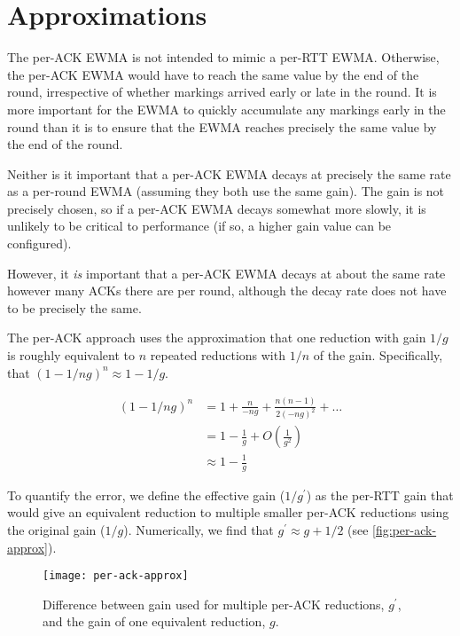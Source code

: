 \section{Approximations}\label{prresp_approx}

The per-ACK EWMA is not intended to mimic a per-RTT EWMA. Otherwise, the per-ACK
EWMA would have to reach the same value by the end of the round, irrespective of
whether markings arrived early or late in the round.
It is more important for the EWMA to quickly accumulate any markings early in
the round than it is to ensure that the EWMA reaches precisely the same value by
the end of the round. 

Neither is it important that a per-ACK EWMA decays at precisely the same rate as
a per-round EWMA (assuming they both use the same gain). The gain is not
precisely chosen, so if a per-ACK EWMA decays somewhat more slowly, it is
unlikely to be critical to performance (if so, a higher gain value can be
configured).

However, it \emph{is} important that a per-ACK EWMA decays at about the same
rate however many ACKs there are per round, although the decay rate does not
have to be precisely the same.

The per-ACK approach uses the approximation that one reduction with gain \(1/g\)
is roughly equivalent to \(n\) repeated reductions with \(1/n\) of the gain.
Specifically, that \((1 - 1/ng)^n \approx 1 - 1/g\).

\begin{align*}
(1 - 1/ng)^n &=       1 + \frac{n}{-ng} + \frac{n(n-1)}{2(-ng)^2} + \ldots \\
             &=       1 - \frac{1}{g} + O\left(\frac{1}{g^2}\right)\\
             &\approx 1 - \frac{1}{g}
\end{align*}

To quantify the error, we define the effective gain
(\(1/g^\prime\)) as the per-RTT gain that would give an equivalent reduction to
multiple smaller per-ACK reductions using the original gain (\(1/g\)).
Numerically, we find that \(g^\prime \approx g + 1/2\) (see \autoref{fig:per-ack-approx}).

\begin{figure}[h]
	\texttt{[image: per-ack-approx]}
	\caption{Difference between gain used for multiple per-ACK reductions, \(g^\prime\), and the gain of one equivalent reduction, \(g\).}
	\label{fig:per-ack-approx}
\end{figure}

